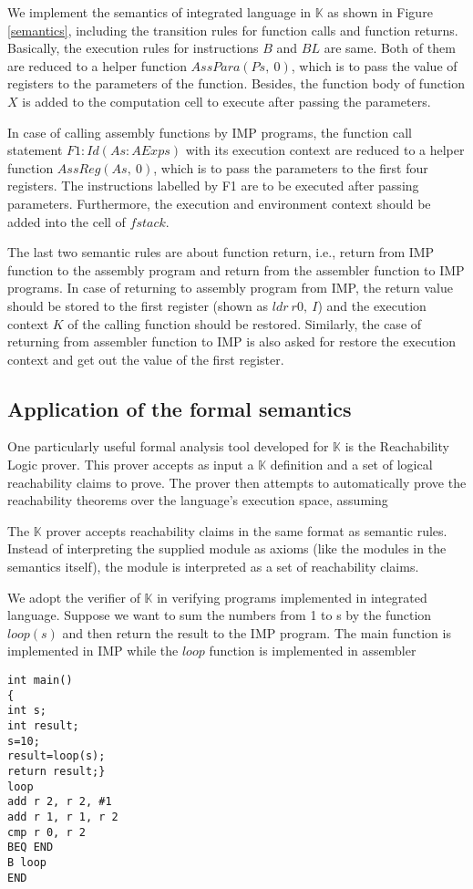 \documentclass[conference]{IEEEtran}
\begin{document}
\par We implement the semantics of integrated language in $\mathbb{K}$ as shown in Figure \ref{semantics}, including the transition rules for function calls and function returns. Basically, the execution rules for instructions $B$ and $BL$ are same. Both of them are reduced to a helper function $AssPara(Ps,~0)$, which is to pass the value of registers to the parameters of the function. Besides, the function body of function $X$ is added to the computation cell to execute after passing the parameters.
\par In case of calling assembly functions by IMP programs, the function call statement $F1:Id(As:AExps)$ with its execution context are reduced to a helper function $AssReg(As,~0)$, which is to pass the parameters to the first four registers. The instructions labelled by F1 are to be executed after  passing parameters. Furthermore, the execution and environment context should be added into the cell of $fstack$.
\par The last two semantic rules are about function return, i.e., return from IMP function to the assembly program and return from the assembler function to IMP programs. In case of returning to assembly program from IMP, the return value should be stored to the first register (shown as $ldr~r0,~I$) and the execution context $K$ of the calling function should be restored. Similarly, the case of returning from assembler function to IMP is also asked for restore the execution context and get out the value of the first register.
\subsection{Application of the formal semantics}
\par One particularly useful formal analysis tool developed for $\mathbb{K}$ is the Reachability Logic prover. This prover
accepts as input a $\mathbb{K}$ definition and a set of logical reachability claims to prove. The prover then attempts
to automatically prove the reachability theorems over the language's execution space, assuming
\par The $\mathbb{K}$ prover accepts reachability claims in the same format as semantic rules.
Instead of interpreting the supplied module as axioms (like the modules in the semantics itself), the module is interpreted as a set of reachability claims.
\par We adopt the verifier of $\mathbb{K}$ in verifying programs implemented in integrated language. Suppose we want to sum the numbers from 1 to s by the function $loop(s)$ and then return the result to the IMP program. The main function is implemented in IMP while the $loop$ function is implemented in assembler
\begin{lstlisting}[multicols=2,xleftmargin=1em]
int main()
{
int s;
int result;
s=10;
result=loop(s);
return result;}
loop
add r 2, r 2, #1
add r 1, r 1, r 2
cmp r 0, r 2
BEQ END
B loop
END
\end{lstlisting}
\end{document}
